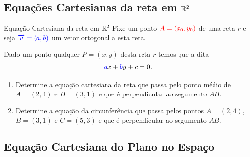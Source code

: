 \subsection*{Equações Cartesianas da reta em $\mathbb{R}^2$}
\begin{frame}[label=retas]{Equação Cartesiana da reta em $\mathbb{R}^2$}
	Fixe um ponto $\textcolor{red}{A=(x_0,y_0)}$ de uma reta $r$ e seja  $\textcolor{blue}{\overrightarrow{v}=(a,b)}$ um vetor ortogonal a esta reta. 
	
		\begin{center}
	\end{center}
	
Dado um ponto qualquer   $P=(x,y)$	desta reta $r$  temos que a  dita 
		\[	\textcolor{blue}{a}x+\textcolor{blue}{b}y+c=0.\]
\end{frame}

\begin{frame}[label=retas]{}
\begin{exe}
\begin{enumerate}
\item Determine a equação cartesiana da reta que passa pelo ponto médio de \(A=(2,4)\) e \(B=(3,1)\) e que é perpendicular ao segumento \(AB\).

\item Determine a equação da circunferência que passa pelos pontos  \(A=(2,4)\), \(B=(3,1)\) e \(C=(5,3)\) e que é perpendicular ao segumento \(AB\).
\end{enumerate}
\end{exe}
\end{frame}
	

\subsection*{Equação Cartesiana do Plano no Espaço}

